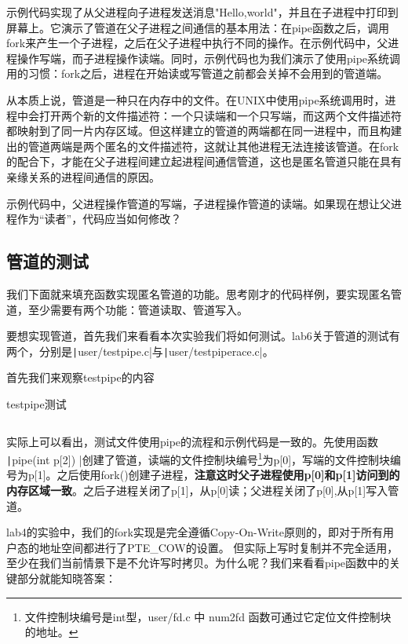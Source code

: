 示例代码实现了从父进程向子进程发送消息"Hello,world"，并且在子进程中打印到屏幕上。它演示了管道在父子进程之间通信的基本用法：在pipe函数之后，调用fork来产生一个子进程，之后在父子进程中执行不同的操作。在示例代码中，父进程操作写端，而子进程操作读端。同时，示例代码也为我们演示了使用pipe系统调用的习惯：fork之后，进程在开始读或写管道之前都会关掉不会用到的管道端。

从本质上说，管道是一种只在内存中的文件。在UNIX中使用pipe系统调用时，进程中会打开两个新的文件描述符：一个只读端和一个只写端，而这两个文件描述符都映射到了同一片内存区域。但这样建立的管道的两端都在同一进程中，而且构建出的管道两端是两个匿名的文件描述符，这就让其他进程无法连接该管道。在fork的配合下，才能在父子进程间建立起进程间通信管道，这也是匿名管道只能在具有亲缘关系的进程间通信的原因。

\begin{thinking}\label{think-father-reader}
	示例代码中，父进程操作管道的写端，子进程操作管道的读端。如果现在想让父进程作为“读者”，代码应当如何修改？
\end{thinking}

\subsection{管道的测试}

我们下面就来填充函数实现匿名管道的功能。思考刚才的代码样例，要实现匿名管道，至少需要有两个功能：管道读取、管道写入。

要想实现管道，首先我们来看看本次实验我们将如何测试。lab6关于管道的测试有两个，分别是\texttt|user/testpipe.c|与\texttt|user/testpiperace.c|。

首先我们来观察testpipe的内容

\begin{codeBoxWithCaption}{testpipe测试\label{code:lab_test_pipe.c}}
	\inputminted[linenos]{c}{codes/lab_test_pipe.c}
\end{codeBoxWithCaption}

实际上可以看出，测试文件使用pipe的流程和示例代码是一致的。先使用函数 \texttt|pipe(int p[2]) |创建了管道，读端的文件控制块编号\footnote{文件控制块编号是int型，user/fd.c 中 num2fd 函数可通过它定位文件控制块的地址。}为p[0]，写端的文件控制块编号为p[1]。之后使用fork()创建子进程，\textbf{注意这时父子进程使用p[0]和p[1]访问到的内存区域一致}。之后子进程关闭了p[1]，从p[0]读；父进程关闭了p[0],从p[1]写入管道。

lab4的实验中，我们的fork实现是完全遵循Copy-On-Write原则的，即对于所有用户态的地址空间都进行了PTE\_COW的设置。
但实际上写时复制并不完全适用，至少在我们当前情景下是不允许写时拷贝。为什么呢？我们来看看pipe函数中的关键部分就能知晓答案：


